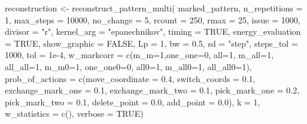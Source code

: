 \documentclass[
  letterpaper,
  DIV=11,
  numbers=noendperiod]{scrreprt}
\newenvironment{Shaded}{\begin{snugshade}}{\end{snugshade}}
\newcommand{\AttributeTok}[1]{\textcolor[rgb]{0.40,0.45,0.13}{#1}}
\newcommand{\ConstantTok}[1]{\textcolor[rgb]{0.56,0.35,0.01}{#1}}
\newcommand{\DecValTok}[1]{\textcolor[rgb]{0.68,0.00,0.00}{#1}}
\newcommand{\FloatTok}[1]{\textcolor[rgb]{0.68,0.00,0.00}{#1}}
\newcommand{\FunctionTok}[1]{\textcolor[rgb]{0.28,0.35,0.67}{#1}}
\newcommand{\NormalTok}[1]{\textcolor[rgb]{0.00,0.23,0.31}{#1}}
\newcommand{\OtherTok}[1]{\textcolor[rgb]{0.00,0.23,0.31}{#1}}
\newcommand{\StringTok}[1]{\textcolor[rgb]{0.13,0.47,0.30}{#1}}
\begin{document}
\begin{Shaded}
\begin{Highlighting}[]
\NormalTok{reconstruction }\OtherTok{\textless{}{-}} \FunctionTok{reconstruct\_pattern\_multi}\NormalTok{(}
\NormalTok{  marked\_pattern, }
  \AttributeTok{n\_repetitions     =} \DecValTok{1}\NormalTok{,     }
  \AttributeTok{max\_steps         =} \DecValTok{10000}\NormalTok{,     }
  \AttributeTok{no\_change         =} \DecValTok{5}\NormalTok{,  }
  \AttributeTok{rcount            =} \DecValTok{250}\NormalTok{,     }
  \AttributeTok{rmax              =} \DecValTok{25}\NormalTok{,      }
  \AttributeTok{issue             =} \DecValTok{1000}\NormalTok{,       }
  \AttributeTok{divisor           =} \StringTok{"r"}\NormalTok{,    }
  \AttributeTok{kernel\_arg        =} \StringTok{"epanechnikov"}\NormalTok{,}
  \AttributeTok{timing            =} \ConstantTok{TRUE}\NormalTok{,    }
  \AttributeTok{energy\_evaluation =} \ConstantTok{TRUE}\NormalTok{,}
  \AttributeTok{show\_graphic      =} \ConstantTok{FALSE}\NormalTok{,  }
  \AttributeTok{Lp                =} \DecValTok{1}\NormalTok{,    }
  \AttributeTok{bw                =} \FloatTok{0.5}\NormalTok{,}
  \AttributeTok{sd                =} \StringTok{"step"}\NormalTok{,}
  \AttributeTok{steps\_tol         =} \DecValTok{1000}\NormalTok{,   }
  \AttributeTok{tol               =} \FloatTok{1e{-}4}\NormalTok{,   }
  \AttributeTok{w\_markcorr        =} \FunctionTok{c}\NormalTok{(}\AttributeTok{m\_m=}\DecValTok{1}\NormalTok{,}\AttributeTok{one\_one=}\DecValTok{0}\NormalTok{,  }\AttributeTok{all=}\DecValTok{1}\NormalTok{, }\AttributeTok{m\_all=}\DecValTok{1}\NormalTok{, }\AttributeTok{all\_all=}\DecValTok{1}\NormalTok{, }\AttributeTok{m\_m0=}\DecValTok{1}\NormalTok{, }\AttributeTok{one\_one0=}\DecValTok{0}\NormalTok{, }\AttributeTok{all0=}\DecValTok{1}\NormalTok{, }\AttributeTok{m\_all0=}\DecValTok{1}\NormalTok{, }\AttributeTok{all\_all0=}\DecValTok{1}\NormalTok{),}
  \AttributeTok{prob\_of\_actions   =} \FunctionTok{c}\NormalTok{(}\AttributeTok{move\_coordinate =} \FloatTok{0.4}\NormalTok{, }\AttributeTok{switch\_coords =} \FloatTok{0.1}\NormalTok{, }\AttributeTok{exchange\_mark\_one =} \FloatTok{0.1}\NormalTok{, }\AttributeTok{exchange\_mark\_two =} \FloatTok{0.1}\NormalTok{, }\AttributeTok{pick\_mark\_one =} \FloatTok{0.2}\NormalTok{, }\AttributeTok{pick\_mark\_two =} \FloatTok{0.1}\NormalTok{, }\AttributeTok{delete\_point =} \FloatTok{0.0}\NormalTok{, }\AttributeTok{add\_point =} \FloatTok{0.0}\NormalTok{), }
  \AttributeTok{k                 =} \DecValTok{1}\NormalTok{,       }
  \AttributeTok{w\_statistics      =} \FunctionTok{c}\NormalTok{(),              }
  \AttributeTok{verbose           =} \ConstantTok{TRUE}\NormalTok{)  }
\end{Highlighting}
\end{Shaded}
\end{document}
